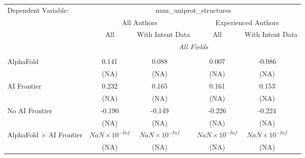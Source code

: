 \begingroup
\centering
\begin{tabular}{lcccccc}
   \tabularnewline \midrule \midrule
   Dependent Variable: & \multicolumn{6}{c}{num\_uniprot\_structures}\\
 & \multicolumn{3}{c}{All Authors} & \multicolumn{3}{c}{Experienced Authors} \\
\cmidrule(lr){2-4} \cmidrule(lr){5-7}
 & \multicolumn{1}{c}{All} & \multicolumn{2}{c}{With Intent Data} & \multicolumn{1}{c}{All} & \multicolumn{2}{c}{With Intent Data} \\
\cmidrule(lr){2-2} \cmidrule(lr){3-4} \cmidrule(lr){5-5} \cmidrule(lr){6-7}
 & \multicolumn{6}{c}{\textit{All Fields}} \\ \\
   AlphaFold                                                                  & 0.141                  & 0.088                  &                        & 0.007                  & -0.086                 &   \\   
                                                                              & (NA)                   & (NA)                   &                        & (NA)                   & (NA)                   &   \\   
   AI Frontier                                                                & 0.232                  & 0.165                  &                        & 0.161                  & 0.153                  &   \\   
                                                                              & (NA)                   & (NA)                   &                        & (NA)                   & (NA)                   &   \\   
   No AI Frontier                                                             & -0.190                 & -0.149                 &                        & -0.226                 & -0.224                 &   \\   
                                                                              & (NA)                   & (NA)                   &                        & (NA)                   & (NA)                   &   \\   
   AlphaFold $\times$ AI Frontier                                             & $NaN\times 10^{-Inf}$  & $NaN\times 10^{-Inf}$  &                        & $NaN\times 10^{-Inf}$  & $NaN\times 10^{-Inf}$  &   \\   
                                                                              & (NA)                   & (NA)                   &                        & (NA)                   & (NA)                   &   \\   

\end{tabular}
